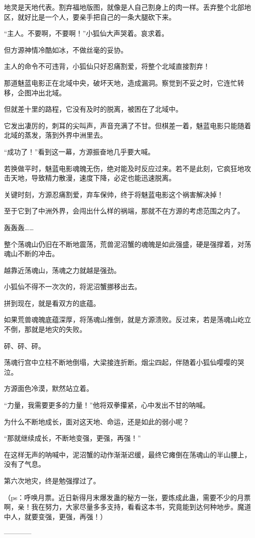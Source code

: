 \begin{this_body}
地灵是天地代表。割弃福地版图，就像是人自己割身上的肉一样。丢弃整个北部地区，就好比是一个人，要亲手把自己的一条大腿砍下来。

“主人。不要啊，不要啊！”小狐仙大声哭着。哀求着。

但方源神情冷酷如冰，不做丝毫的妥协。

主人的命令不可违背，小狐仙只好忍痛割爱，将整个北域直接割弃！

那道魅蓝电影正在北域中央，破坏天地，造成漏洞。察觉到不妥之时，它连忙转移，企图冲出北域。

但就差十里的路程，它没有及时的脱离，被困在了北域中。

它发出凄厉的，刺耳的尖叫声，声音充满了不甘。但棋差一着，魅蓝电影只能随着北域的蒸发，落到外界中洲里去。

“成功了！”看到这一幕，方源振奋地几乎要大喊。

若换做平时，魅蓝电影魂魄无伤，绝对能及时反应过来。若不是此刻，它疯狂地攻击天地，导致精力散漫，速度下降，必定也能迅速脱离。

关键时刻，方源忍痛割爱，弃车保帅，终于将魅蓝电影这个祸害解决掉！

至于它到了中洲外界，会闯出什么样的祸端，那就不在方源的考虑范围之内了。

轰轰轰……

整个荡魂山仍旧在不断地震荡，荒兽泥沼蟹的魂魄是如此强盛，硬是强撑着，对荡魂山不断的冲击。

越靠近荡魂山，荡魂之力就越是强劲。

小狐仙不得不一次次的，将泥沼蟹挪移出去。

拼到现在，就是看双方的底蕴。

如果荒兽魂魄底蕴深厚，将荡魂山推倒，就是方源溃败。反过来，若是荡魂山屹立不倒，那就是地灾的失败。

砰、砰、砰。

荡魂行宫中立柱不断地倒塌，大梁接连折断。烟尘四起，伴随着小狐仙嘤嘤的哭泣。

方源面色冷漠，默然站立着。

“力量，我需要更多的力量！”他将双拳攥紧，心中发出不甘的呐喊。

为什么不断地成长，面对这天地、命运，还是如此的弱小呢？

“那就继续成长，不断地变强，更强，再强！”

在这样无声的呐喊中，泥沼蟹的动作渐渐迟缓，最终它瘫倒在荡魂山的半山腰上，没有了气息。

第六次地灾，终是勉强撑过了。

（ps：呼唤月票。近日新得月末爆发蛊的秘方一张，要炼成此蛊，需要不少的月票啊，亲！我在努力，大家尽量多多支持，看看这本书，究竟能到达何种地步。魔道中人，就要变强，更强，再强！）

------------

\end{this_body}

